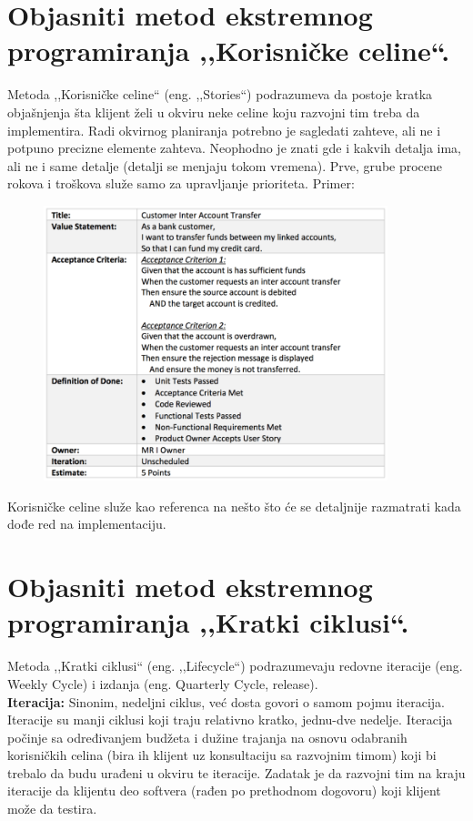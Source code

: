\documentclass[a4paper]{article}
\begin{document}
\section{Objasniti metod ekstremnog programiranja ,,Korisničke celine``.}
  Metoda ,,Korisničke celine`` (eng. ,,Stories``) podrazumeva da postoje kratka objašnjenja
  šta klijent želi u okviru neke celine koju razvojni tim treba da implementira. Radi okvirnog
  planiranja potrebno je sagledati zahteve, ali ne i potpuno precizne elemente zahteva. Neophodno
  je znati gde i kakvih detalja ima, ali ne i same detalje (detalji se menjaju tokom vremena). 
  Prve, grube procene rokova i troškova služe samo za upravljanje prioriteta. Primer:
  \begin{figure}[H]
    \begin{center}
        \includegraphics[width=100mm,height=80mm]{Slike/korisnicka_prica.png}
    \end{center}
  \end{figure} 

  Korisničke celine služe kao referenca na nešto što će se detaljnije razmatrati kada dođe red
  na implementaciju. 

\section{Objasniti metod ekstremnog programiranja ,,Kratki ciklusi``.}
  Metoda ,,Kratki ciklusi`` (eng. ,,Lifecycle``) podrazumevaju redovne iteracije (eng. Weekly Cycle) i 
  izdanja (eng. Quarterly Cycle, release).\\
  
  \textbf{Iteracija:} Sinonim, nedeljni ciklus, već dosta govori o samom pojmu iteracija.
  Iteracije su manji ciklusi koji traju relativno kratko, jednu-dve nedelje. 
  Iteracija počinje sa određivanjem budžeta i dužine trajanja na osnovu odabranih
  korisničkih celina (bira ih klijent uz konsultaciju sa razvojnim timom) koji bi trebalo 
  da budu urađeni u okviru te iteracije. Zadatak je da razvojni tim na kraju iteracije
  da klijentu deo softvera (rađen po prethodnom dogovoru) koji klijent može da testira.
\end{document}
